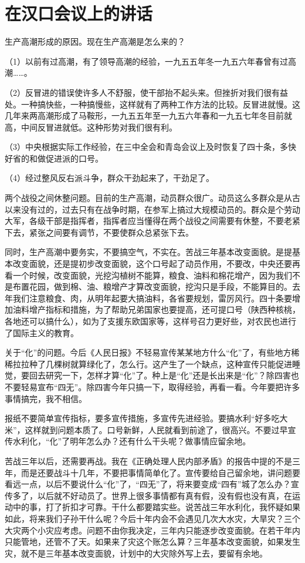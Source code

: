 \section[在汉口会议上的讲话（一九五八年四月六日）]{在汉口会议上的讲话}


生产高潮形成的原因。现在生产高潮是怎么来的？

（1）以前有过高潮，有了领导高潮的经验，一九五五年冬一九五六年春曾有过高潮……。

（2）反冒进的错误使许多人不舒服，使干部抬不起头来。但挫折对我们很有益处。一种搞快些，一种搞慢些，这样就有了两种工作方法的比较。反冒进就慢。这几年来两高潮形成了马鞍形，一九五五年至一九五六年春和一九五七年冬目前就高，中间反冒进就低。这种形势对我们很有利。

（3）中央根据实际工作经验，在三中全会和青岛会议上及时恢复了四十条，多快好省的和做促进派的口号。

（4）经过整风反右派斗争，群众干劲起来了，干劲足了。

两个战役之间休整问题。目前的生产高潮，动员群众很广。动员这么多群众是从古以来没有过的，过去只有在战争时期，在参军上搞过大规模动员的。群众是个劳动大军，各级干部是指挥者，指挥者应当懂得在两个战役之间需要有休整，不要老紧下去，紧张之间要有调节，不要使群众总紧张下去。

同时，生产高潮中要务实，不要搞空气，不实在。苦战三年基本改变面貌。是提基本改变面貌，还是提初步改变面貌，这个口号起了动员作用，不要改，中央还要再看一个时候，改变面貌，光挖沟植树不能算，粮食、油料和棉花增产，因为我们不是布置花园，做到棉、油、粮增产才算改变面貌，挖沟只是手段，不能算目的。去年我们注意粮食、肉，从明年起要大搞油料，各省要规划，雷厉风行。四十条要增加油料增产指标和措施，为了帮助兄弟国家也要提高，还可提口号（陕西种核桃，各地还可以搞什么），如为了支援东欧国家等，这样号召力更好些，对农民也进行了国际主义的教育。

关于“化”的问题。今后《人民日报》不轻易宣传某某地方什么“化”了，有些地方稀稀拉拉种了几棵树就算绿化了，怎么行。这产生了一个缺点，这种宣传只能促进睡觉，要回去研究一下，怎样才算“化”了。种上是“化”还是长出来是“化”？除四害也不要轻易宣布“四无”。除四害今年只搞一下，取得经验，再看一看。今年要把许多事情搞完，我不相信。

报纸不要简单宣传指标，要多宣传措施，多宣传先进经验。要搞水利“好多吃大米”，这样就到问题本质了。口号新鲜，人民就看到前途了，很高兴。不要过早宣传水利化，“化”了明年怎么办？还有什么干头呢？做事情应留余地。

苦战三年以后，还需要再战。我在《正确处理人民内部矛盾》的报告中提的不是三年，而是还要战斗十几年，不要把事情简单化了。宣传要给自己留余地，讲问题要看远一点，以后不要说什么“化”了，“四无”了，将来要变成“四有”城了怎么办？宣传多了，以后就不好动员了。世界上很多事情都有真有假，没有假也没有真，在运动中的事，打了折扣才可靠。干什么都要踏实些。说苦战三年水利化，我怀疑如果如此，将来我们子孙干什么呢？今后十年内会不会遇见几次大水灾，大旱灾？三个大灾两个小灾应考虑。问题不由你我决定，三年内只能逐步改变面貌。在若干年内只能管地，还管不了天。如果来了灾这个账怎么算？三年基本改变面貌，如果发生灾，就不是三年基本改变面貌，计划中的大灾除外写上去，要留有余地。


